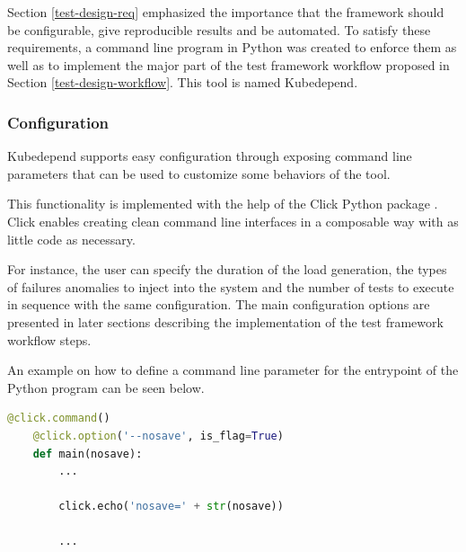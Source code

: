 
Section \ref{test-design-req} emphasized the importance that the framework should be configurable, give reproducible results and be automated. To satisfy these requirements, a command line program in Python was created to enforce them as well as to implement the major part of the test framework workflow proposed in Section \ref{test-design-workflow}. This tool is named Kubedepend.

\subsubsection{Configuration}

Kubedepend supports easy configuration through exposing command line parameters that can be used to customize some behaviors of the tool.

This functionality is implemented with the help of the Click Python package \cite{Click}. Click enables creating clean command line interfaces in a composable way with as little code as necessary.

For instance, the user can specify the duration of the load generation, the types of failures anomalies to inject into the system and the number of tests to execute in sequence with the same configuration. The main configuration options are presented in later sections describing the implementation of the test framework workflow steps.

An example on how to define a command line parameter for the entrypoint of the Python program can be seen below.

\vspace{0.5cm}
\begin{minipage}{\linewidth}
	\begin{lstlisting}[language=python, caption={Define a parameter to control saving test results (simplified extract)}, label={lst:click-option}]
	@click.command()
	@click.option('--nosave', is_flag=True)
	def main(nosave):
		...
	
		click.echo('nosave=' + str(nosave))
		
		...
	\end{lstlisting}
\end{minipage}

